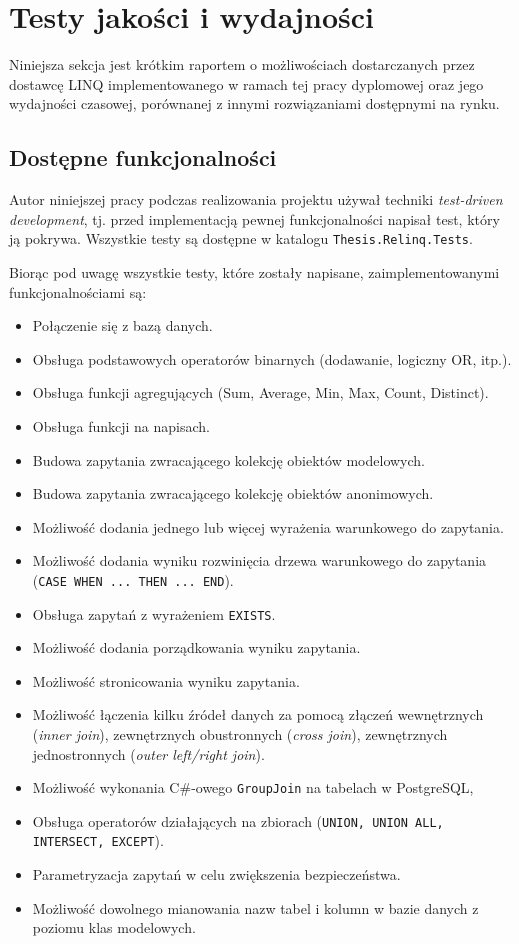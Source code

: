 \chapter{Testy jakości i wydajności}
Niniejsza sekcja jest krótkim raportem o możliwościach dostarczanych przez dostawcę LINQ implementowanego w ramach tej pracy dyplomowej oraz jego wydajności czasowej, porównanej z innymi rozwiązaniami dostępnymi na rynku.

\section{Dostępne funkcjonalności}
Autor niniejszej pracy podczas realizowania projektu używał techniki \textit{test-driven development}, tj. przed implementacją pewnej funkcjonalności napisał test, który ją pokrywa. Wszystkie testy są dostępne w katalogu \texttt{Thesis.Relinq.Tests}.

Biorąc pod uwagę wszystkie testy, które zostały napisane, zaimplementowanymi funkcjonalnościami są:

\begin{itemize}
\setlength\itemsep{0em}
\item Połączenie się z bazą danych.
\item Obsługa podstawowych operatorów binarnych (dodawanie, logiczny OR, itp.).
\item Obsługa funkcji agregujących (Sum, Average, Min, Max, Count, Distinct).
\item Obsługa funkcji na napisach.
\item Budowa zapytania zwracającego kolekcję obiektów modelowych.
\item Budowa zapytania zwracającego kolekcję obiektów anonimowych.
\item Możliwość dodania jednego lub więcej wyrażenia warunkowego do zapytania.
\item Możliwość dodania wyniku rozwinięcia drzewa warunkowego do zapytania \linebreak (\texttt{CASE WHEN ... THEN ... END}).
\item Obsługa zapytań z wyrażeniem \texttt{EXISTS}.
\item Możliwość dodania porządkowania wyniku zapytania.
\item Możliwość stronicowania wyniku zapytania.
\item Możliwość łączenia kilku źródeł danych za pomocą złączeń wewnętrznych \linebreak (\textit{inner join}), zewnętrznych obustronnych (\textit{cross join}), zewnętrznych jednostronnych (\textit{outer left/right join}).
\item Możliwość wykonania C\#-owego \texttt{GroupJoin} na tabelach w PostgreSQL,
\item Obsługa operatorów działających na zbiorach (\texttt{UNION, UNION ALL, \linebreak INTERSECT, EXCEPT}).
\item Parametryzacja zapytań w celu zwiększenia bezpieczeństwa.
\item Możliwość dowolnego mianowania nazw tabel i kolumn w bazie danych z poziomu klas modelowych.
\end{itemize}

